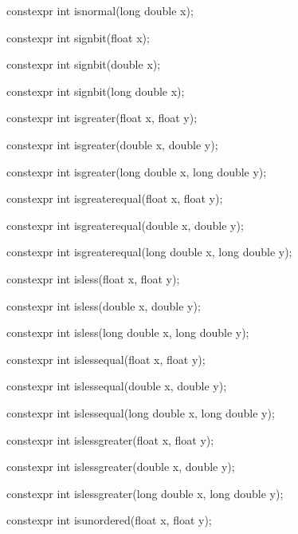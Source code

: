 \documentclass[prd,twocolumn,amsmath,amssymb,nofootinbib,eqsecnum]{revtex4-1}
\newcommand{\highlight}[1]{{\color{red} #1}}
\begin{document}
\begin{widetext}
{\highlight{constexpr} int isnormal(long double x);

\vspace{2ex}

\highlight{constexpr} int signbit(float x);

\highlight{constexpr} int signbit(double x);

\highlight{constexpr} int signbit(long double x);

\vspace{2ex}

\highlight{constexpr} int isgreater(float x, float y);

\highlight{constexpr} int isgreater(double x, double y);

\highlight{constexpr} int isgreater(long double x, long double y);

\vspace{2ex}

\highlight{constexpr} int isgreaterequal(float x, float y);

\highlight{constexpr} int isgreaterequal(double x, double y);

\highlight{constexpr} int isgreaterequal(long double x, long double y);

\vspace{2ex}

\highlight{constexpr} int isless(float x, float y);

\highlight{constexpr} int isless(double x, double y);

\highlight{constexpr} int isless(long double x, long double y);

\vspace{2ex}

\highlight{constexpr} int islessequal(float x, float y);

\highlight{constexpr} int islessequal(double x, double y);

\highlight{constexpr} int islessequal(long double x, long double y);

\vspace{2ex}

\highlight{constexpr} int islessgreater(float x, float y);

\highlight{constexpr} int islessgreater(double x, double y);

\highlight{constexpr} int islessgreater(long double x, long double y);

\vspace{2ex}

\highlight{constexpr} int isunordered(float x, float y);

}
\end{widetext}
\end{document}

